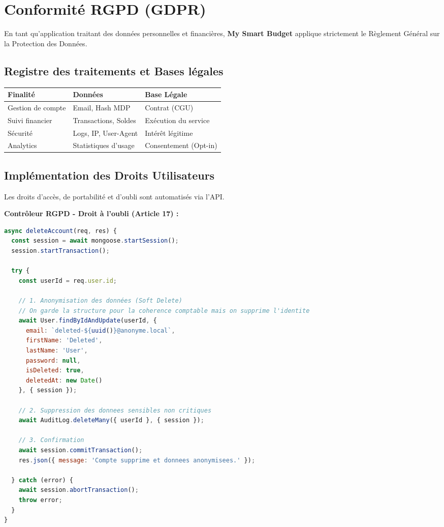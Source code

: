 \section{Conformité RGPD (GDPR)}

En tant qu'application traitant des données personnelles et financières, \textbf{My Smart Budget} applique strictement le Règlement Général sur la Protection des Données.



\subsection{Registre des traitements et Bases légales}

\begin{center}
\small
\begin{tabular}{|p{}|p{}|p{}|}
\hline
\textbf{Finalité} & \textbf{Données} & \textbf{Base Légale} \\
\hline
Gestion de compte & Email, Hash MDP & Contrat (CGU) \\
\hline
Suivi financier & Transactions, Soldes & Exécution du service \\
\hline
Sécurité & Logs, IP, User-Agent & Intérêt légitime \\
\hline
Analytics & Statistiques d'usage & Consentement (Opt-in) \\
\hline
\end{tabular}
\end{center}

\subsection{Implémentation des Droits Utilisateurs}

Les droits d'accès, de portabilité et d'oubli sont automatisés via l'API.

\begin{exemple}
\textbf{Contrôleur RGPD - Droit à l'oubli (Article 17) :}
\begin{lstlisting}[language=JavaScript]
async deleteAccount(req, res) {
  const session = await mongoose.startSession();
  session.startTransaction();
  
  try {
    const userId = req.user.id;

    // 1. Anonymisation des données (Soft Delete)
    // On garde la structure pour la coherence comptable mais on supprime l'identite
    await User.findByIdAndUpdate(userId, {
      email: `deleted-${uuid()}@anonyme.local`,
      firstName: 'Deleted',
      lastName: 'User',
      password: null,
      isDeleted: true,
      deletedAt: new Date()
    }, { session });

    // 2. Suppression des donnees sensibles non critiques
    await AuditLog.deleteMany({ userId }, { session });

    // 3. Confirmation
    await session.commitTransaction();
    res.json({ message: 'Compte supprime et donnees anonymisees.' });
    
  } catch (error) {
    await session.abortTransaction();
    throw error;
  }
}
\end{lstlisting}
\end{exemple}

